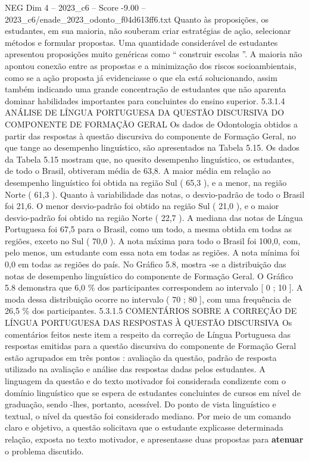 \begin{textsample}{NEG Dim 4 – 2023\_c6 – Score -9.00 – 2023\_c6/enade\_2023\_odonto\_f04d613ff6.txt}
Quanto às proposições, os estudantes, em sua maioria, não souberam criar estratégias de ação, selecionar métodos e formular propostas.
Uma quantidade considerável de estudantes apresentou proposições muito genéricas como “ construir escolas ”.
A maioria não apontou conexão entre as propostas e a minimização dos riscos socioambientais, como se a ação proposta já evidenciasse o que ela está solucionando, assim também indicando uma grande concentração de estudantes que não aparenta dominar habilidades importantes para concluintes do ensino superior. 5.3.1.4 ANÁLISE DE LÍNGUA PORTUGUESA DA QUESTÃO DISCURSIVA DO COMPONENTE DE FORMAÇÃO GERAL Os dados de Odontologia obtidos a partir das respostas à questão discursiva do componente de Formação Geral, no que tange ao desempenho linguístico, são apresentados na Tabela 5.15.
Os dados da Tabela 5.15 mostram que, no quesito desempenho linguístico, os estudantes, de todo o Brasil, obtiveram média de 63,8.
A maior média em relação ao desempenho linguístico foi obtida na região Sul ( 65,3 ), e a menor, na região Norte ( 61,3 ).
Quanto à variabilidade das notas, o desvio-padrão de todo o Brasil foi 21,6.
O menor desvio-padrão foi obtido na região Sul ( 21,0 ), e o maior desvio-padrão foi obtido na região Norte ( 22,7 ).
A mediana das notas de Língua Portuguesa foi 67,5 para o Brasil, como um todo, a mesma obtida em todas as regiões, exceto no Sul ( 70,0 ).
A nota máxima para todo o Brasil foi 100,0, com, pelo menos, um estudante com essa nota em todas as regiões.
A nota mínima foi 0,0 em todas as regiões do país.
No Gráfico 5.8, mostra -se a distribuição das notas de desempenho linguístico do componente de Formação Geral.
O Gráfico 5.8 demonstra que 6,0 \% dos participantes correspondem ao intervalo [ 0 ; 10 ].
A moda dessa distribuição ocorre no intervalo ( 70 ; 80 ], com uma frequência de 26,5 \% dos participantes. 5.3.1.5 COMENTÁRIOS SOBRE A CORREÇÃO DE LÍNGUA PORTUGUESA DAS RESPOSTAS À QUESTÃO DISCURSIVA Os comentários feitos neste item a respeito da correção de Língua Portuguesa das respostas emitidas para a questão discursiva do componente de Formação Geral estão agrupados em três pontos : avaliação da questão, padrão de resposta utilizado na avaliação e análise das respostas dadas pelos estudantes.
A linguagem da questão e do texto motivador foi considerada condizente com o domínio linguístico que se espera de estudantes concluintes de cursos em nível de graduação, sendo -lhes, portanto, acessível.
Do ponto de vista linguístico e textual, o nível da questão foi considerado mediano.
Por meio de um comando claro e objetivo, a questão solicitava que o estudante explicasse determinada relação, exposta no texto motivador, e apresentasse duas propostas para \textbf{atenuar} o problema discutido.

\end{textsample}
